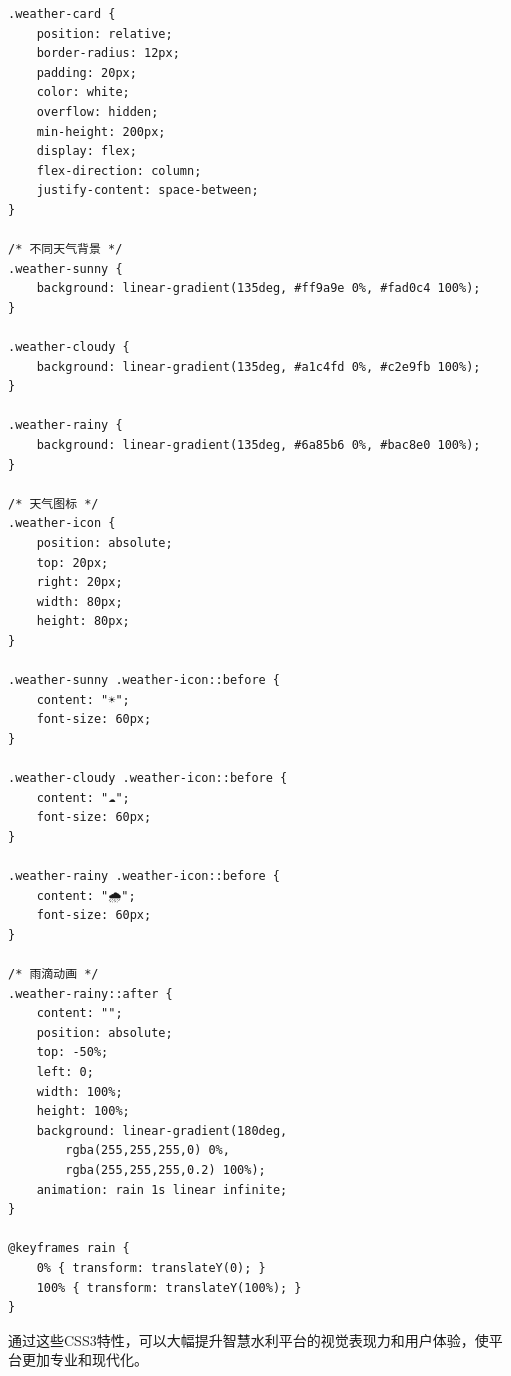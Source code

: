 \begin{lstlisting}
.weather-card {
    position: relative;
    border-radius: 12px;
    padding: 20px;
    color: white;
    overflow: hidden;
    min-height: 200px;
    display: flex;
    flex-direction: column;
    justify-content: space-between;
}

/* 不同天气背景 */
.weather-sunny {
    background: linear-gradient(135deg, #ff9a9e 0%, #fad0c4 100%);
}

.weather-cloudy {
    background: linear-gradient(135deg, #a1c4fd 0%, #c2e9fb 100%);
}

.weather-rainy {
    background: linear-gradient(135deg, #6a85b6 0%, #bac8e0 100%);
}

/* 天气图标 */
.weather-icon {
    position: absolute;
    top: 20px;
    right: 20px;
    width: 80px;
    height: 80px;
}

.weather-sunny .weather-icon::before {
    content: "☀️";
    font-size: 60px;
}

.weather-cloudy .weather-icon::before {
    content: "☁️";
    font-size: 60px;
}

.weather-rainy .weather-icon::before {
    content: "🌧️";
    font-size: 60px;
}

/* 雨滴动画 */
.weather-rainy::after {
    content: "";
    position: absolute;
    top: -50%;
    left: 0;
    width: 100%;
    height: 100%;
    background: linear-gradient(180deg, 
        rgba(255,255,255,0) 0%, 
        rgba(255,255,255,0.2) 100%);
    animation: rain 1s linear infinite;
}

@keyframes rain {
    0% { transform: translateY(0); }
    100% { transform: translateY(100%); }
}
\end{lstlisting}

通过这些CSS3特性，可以大幅提升智慧水利平台的视觉表现力和用户体验，使平台更加专业和现代化。
